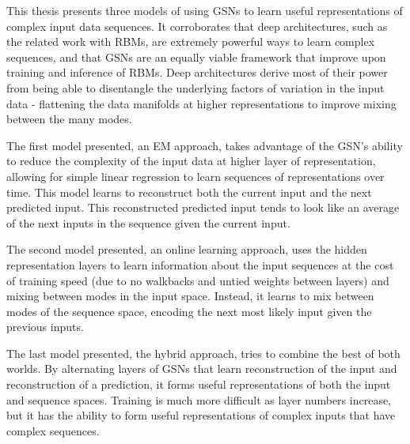 This thesis presents three models of using GSNs to learn useful representations of complex input data sequences. It corroborates that deep architectures, such as the related work with RBMs, are extremely powerful ways to learn complex sequences, and that GSNs are an equally viable framework that improve upon training and inference of RBMs. Deep architectures derive most of their power from being able to disentangle the underlying factors of variation in the input data - flattening the data manifolds at higher representations to improve mixing between the many modes.

The first model presented, an EM approach, takes advantage of the GSN's ability to reduce the complexity of the input data at higher layer of representation, allowing for simple linear regression to learn sequences of representations over time. This model learns to reconstruct both the current input and the next predicted input. This reconstructed predicted input tends to look like an average of the next inputs in the sequence given the current input.

The second model presented, an online learning approach, uses the hidden representation layers to learn information about the input sequences at the cost of training speed (due to no walkbacks and untied weights between layers) and mixing between modes in the input space. Instead, it learns to mix between modes of the sequence space, encoding the next most likely input given the previous inputs.

The last model presented, the hybrid approach, tries to combine the best of both worlds. By alternating layers of GSNs that learn reconstruction of the input and reconstruction of a prediction, it forms useful representations of both the input and sequence spaces. Training is much more difficult as layer numbers increase, but it has the ability to form useful representations of complex inputs that have complex sequences.
